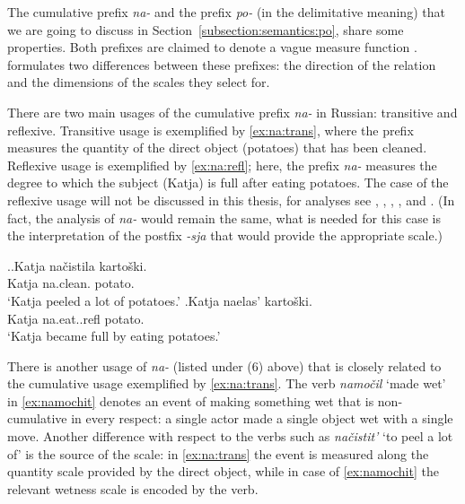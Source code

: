 The cumulative prefix \textit{na-} and the prefix \textit{po-} (in the delimitative meaning) that we are going to discuss in Section~\ref{subsection:semantics:po}, share some properties. Both prefixes are claimed to denote a vague measure function \citep{Filip:00, Souchkova:04}. \citet{Souchkova:04} formulates two differences between these prefixes: the direction of the relation and the dimensions of the scales they select for.

There are two main usages of the cumulative prefix \textit{na-} in Russian: transitive and reflexive. Transitive usage is exemplified by \ref{ex:na:trans}, where the prefix measures the quantity of the direct object (potatoes) that has been cleaned. Reflexive usage is exemplified by \ref{ex:na:refl}; here, the prefix \textit{na-} measures the degree to which the subject (Katja) is full after eating potatoes. The case of the reflexive usage will not be discussed in this thesis, for analyses see \citet{KaganPereltsvaig:11a}, \citet{KaganPereltsvaig:11b}, \citet{Souchkova:04}, \citet{Filip:00}, and \citet{Filip:05}. (In fact, the analysis of \textit{na-} would remain the same, what is needed for this case is the interpretation of the postfix \textit{-sja} that would provide the appropriate scale.)

\ex.\ag.\label{ex:na:trans}Katja na\v{c}istila karto\v{s}ki.\\
Katja na.clean. potato.\\
\vspace{0.5em}
`Katja peeled a lot of potatoes.'
\bg.\label{ex:na:refl}Katja naelas' karto\v{s}ki.\\
Katja na.eat..refl potato.\\
\vspace{0.5em}
`Katja became full by eating potatoes.'

There is another usage of \textit{na-} (listed under (6) above) that is closely related to the cumulative usage exemplified by \ref{ex:na:trans}. The verb \textit{namo\v{c}il} `made wet' in \ref{ex:namochit} denotes an event of making something wet that is non-cumulative in every respect: a single actor made a single object wet with a single move. Another difference with respect to the verbs such as \textit{na\v{c}istit'} `to peel a lot of' is the source of the scale: in \ref{ex:na:trans} the event is measured along the quantity scale provided by the direct object, while in case of \ref{ex:namochit} the relevant wetness scale is encoded by the verb.

